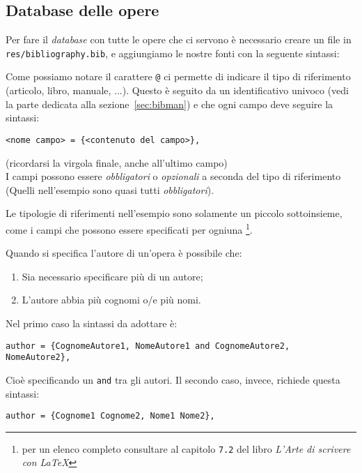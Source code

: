 \subsection{Database delle opere}
Per fare il \textit{database} con tutte le opere che ci servono è necessario
creare un file in \texttt{res/bibliography.bib}, e aggiungiamo le nostre fonti
con la seguente sintassi:

Come possiamo notare il carattere \verb!@! ci permette di indicare il tipo di
riferimento (articolo, libro, manuale, ...). Questo è seguito da un
identificativo univoco (vedi la parte dedicata alla sezione~\ref{sec:bibman})
e che ogni campo deve seguire la sintassi:
\begin{lstlisting}
<nome campo> = {<contenuto del campo>},
\end{lstlisting}
(ricordarsi la virgola finale, anche all'ultimo campo)\\
I campi possono essere \emph{obbligatori} o \emph{opzionali} a seconda del
tipo di riferimento (Quelli nell'esempio sono quasi tutti \emph{obbligatori}).
\par Le tipologie di riferimenti nell'esempio sono solamente un piccolo
sottoinsieme, come i campi che possono essere specificati per ogniuna
\footnote{per un elenco completo consultare al capitolo \texttt{7.2} del libro
\textit{L'Arte di scrivere con \LaTeX{}}}.
\par Quando si specifica l'autore di un'opera è possibile che:
\begin{enumerate}
    \item Sia necessario specificare più di un autore;
    \item L'autore abbia più cognomi o/e più nomi.
\end{enumerate}
Nel primo caso la sintassi da adottare è:
\begin{lstlisting}
author = {CognomeAutore1, NomeAutore1 and CognomeAutore2, NomeAutore2},
\end{lstlisting}
Cioè specificando un \texttt{and} tra gli autori. Il secondo caso, invece,
richiede questa sintassi:
\begin{lstlisting}
author = {Cognome1 Cognome2, Nome1 Nome2},
\end{lstlisting}

